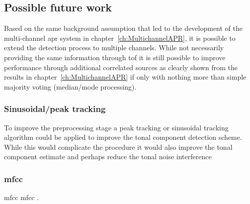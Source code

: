 \subsection{Possible future work}
Based on the same background assumption that led to the development of the multi-channel \DIFdelbegin {}\DIFdelend \DIFaddbegin \gls{apr} \DIFaddend system in chapter~\ref{ch:MultichannelAPR}, it is possible to extend the detection process to multiple channels. While not necessarily providing the same information through \DIFdelbegin {}\DIFdelend \DIFaddbegin \gls{tof} \DIFaddend it is still possible to improve performance through additional correlated sources as clearly shown from the results in chapter~\ref{ch:MultichannelAPR} if only with nothing more than simple majority voting (median/mode processing).

\subsubsection{Sinusoidal/peak tracking}
To improve the preprocessing stage a peak tracking or sinusoidal tracking algorithm could be applied to improve the tonal component detection scheme. While this would complicate the procedure it would also improve the tonal component estimate and perhaps reduce the tonal noise interference \cite{McAulay1986}\DIFaddbegin {}

\subsubsection{\gls{mfcc} }\label{corrections:mfcc2}
\gls{mfcc} \gls{mfcc} \DIFaddend .



